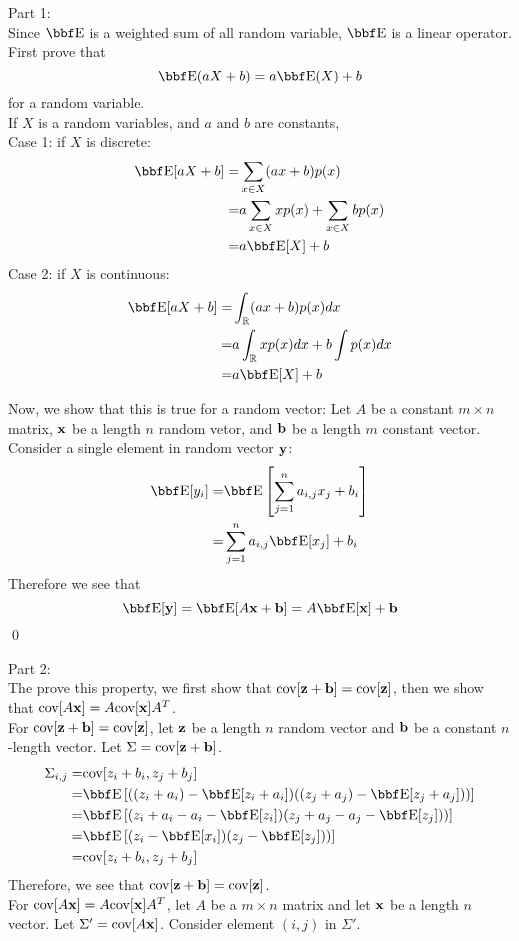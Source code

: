 \documentclass[12pt,letterpaper]{hmcpset}
\begin{document}
\begin{solution}
Part 1:\\
Since $\EE$ is a weighted sum of all random variable, $\EE$ is a linear operator.
First prove that
\[\EE(aX + b) = a\EE(X)+ b\]
for a random variable.\\
If $X$ is a random variables, and
$a$ and $b$ are constants, \\
Case 1: if $X$ is discrete:
\begin{align*}
  \EE[aX + b] =& \sum_{x \in X} (ax+b)p(x)\\
  =&a\sum_{x\in X} xp(x)+ \sum_{x\in X} bp(x)\\
  =& a\EE[X] + b
\end{align*}
\noindent
Case 2: if $X$ is continuous:
\begin{align*}
  \EE[aX + b] =& \int_{\mathbb{R}} (ax+b)p(x) dx\\
  =& a\int_{\mathbb{R}}xp(x)dx + b \int p(x) dx\\
  =& a\EE[X] + b
\end{align*}


Now, we show that this is true for a random vector:
 Let $A$ be a constant $m\times n$ matrix,
 ${\bf x}$ be a length $n$ random vetor,
 and ${\bf b}$ be a length $m$ constant vector.
 Consider a single element in random vector ${\bf y}$:
    \begin{align*}
      \EE[y_i]=&
    \EE\left[\sum_{j=1}^n a_{i, j} x_j +b_i\right]\\
    =&\sum_{j=1}^n a_{i, j} \EE[x_j] + b_i\\
    \end{align*}
    Therefore we see that
    \[    \EE[\yy] = \EE[A\xx +\bb] = A\EE[\xx ]+ \bb \]
    \qed

\noindent Part 2: \\
The prove this property, we first show that ${\hbox{cov}}[{\bf z} + {\bf b}] = {\hbox{cov}}[{\bf z}]$, then we show that ${\hbox{cov}}[A{\bf x} ] = A{\hbox{cov}}[{\bf x}]A^T$. \\
For ${\hbox{cov}}[{\bf z} + {\bf b}] = {\hbox{cov}}[{\bf z}]$, let ${\bf z}$ be a length $n$ random vector and ${\bf b}$ be a constant $n$-length vector.
Let $\Sigma = {\hbox{cov}}[{\bf z} + {\bf b}]$.
\begin{align*}
  \Sigma_{i,j} =& \cov[z_i + b_i, z_j+b_j]\\
  =& \EE \left[ ( (z_i+a_i)-\EE[z_i+a_i])((z_j+a_j)-\EE[z_j+a_j])) \right]\\
  =& \EE \left[ ( z_i+a_i-a_i-\EE[z_i])(z_j+a_j-a_j-\EE[z_j])) \right]\\
  =& \EE \left[ ( z_i-\EE[x_i])(z_j-\EE[z_j])) \right]\\
  =&\cov[z_i + b_i, z_j+b_j]\\
\end{align*}
Therefore, we see that ${\hbox{cov}}[{\bf z} + {\bf b}] = {\hbox{cov}}[{\bf z}]$. \\
For ${\hbox{cov}}[A{\bf x} ] = A{\hbox{cov}}[{\bf x}]A^T$, let $A$ be a $m \times n$ matrix and let ${\bf x}$
be a length $n$ vector.
Let $\Sigma' = {\hbox{cov}}[A{\bf x}]$. Consider element $(i, j)$ in $\Sigma'$.


\end{solution}
\end{document}
